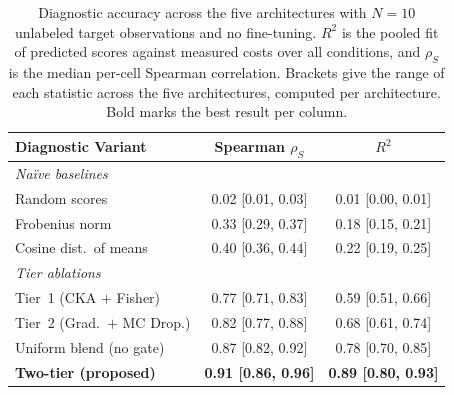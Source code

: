 \begin{table}[tbp]
    \centering
    \caption{Diagnostic accuracy across the five architectures with $N = 10$ unlabeled target observations and no fine-tuning. $R^2$ is the pooled fit of predicted scores against measured costs over all conditions, and $\rho_S$ is the median per-cell Spearman correlation. Brackets give the range of each statistic across the five architectures, computed per architecture. Bold marks the best result per column.}
    \label{tab:diagnostic-aggregate}
    \scriptsize
    \setlength{\tabcolsep}{2.8pt}
    \begin{tabular}{lcc}
        \toprule
        \textbf{Diagnostic Variant} & \textbf{Spearman $\rho_S$} & \textbf{$R^2$} \\
        \midrule
        \multicolumn{3}{l}{\textit{Na{\"i}ve baselines}} \\
        Random scores                       & 0.02 [0.01, 0.03] & 0.01 [0.00, 0.01] \\
        Frobenius norm      & 0.33 [0.29, 0.37] & 0.18 [0.15, 0.21] \\
        Cosine dist.\ of means & 0.40 [0.36, 0.44] & 0.22 [0.19, 0.25] \\
        \midrule
        \multicolumn{3}{l}{\textit{Tier ablations}} \\
        Tier~1 (CKA $+$ Fisher) & 0.77 [0.71, 0.83] & 0.59 [0.51, 0.66] \\
        Tier~2 (Grad.\ $+$ MC Drop.) & 0.82 [0.77, 0.88] & 0.68 [0.61, 0.74] \\
        Uniform blend (no gate) & 0.87 [0.82, 0.92] & 0.78 [0.70, 0.85] \\
        \midrule
        \textbf{Two-tier (proposed)}        & \textbf{0.91 [0.86, 0.96]} & \textbf{0.89 [0.80, 0.93]} \\
        \bottomrule
    \end{tabular}
\end{table}